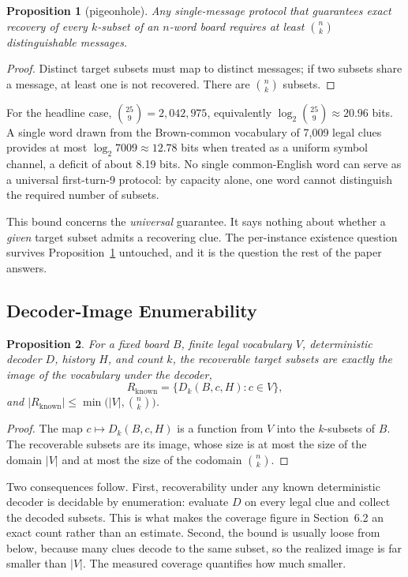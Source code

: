 \documentclass[11pt]{article}
\newtheorem{proposition}{Proposition}
\begin{document}
\begin{proposition}[pigeonhole]\label{prop:pigeonhole}
Any single-message protocol that guarantees exact recovery of every $k$-subset of
an $n$-word board requires at least $\binom{n}{k}$ distinguishable messages.
\end{proposition}

\begin{proof}
Distinct target subsets must map to distinct messages; if two subsets share a
message, at least one is not recovered. There are $\binom{n}{k}$ subsets.
\end{proof}

For the headline case, $\binom{25}{9} = 2{,}042{,}975$, equivalently
$\log_2 \binom{25}{9} \approx 20.96$ bits. A single word drawn from the
Brown-common vocabulary of 7,009 legal clues provides at most
$\log_2 7009 \approx 12.78$ bits when treated as a uniform symbol channel, a
deficit of about 8.19 bits. No single common-English word can serve as a
universal first-turn-9 protocol: by capacity alone, one word cannot distinguish
the required number of subsets.

This bound concerns the \emph{universal} guarantee. It says nothing about whether
a \emph{given} target subset admits a recovering clue. The per-instance existence
question survives Proposition~\ref{prop:pigeonhole} untouched, and it is the
question the rest of the paper answers.

\subsection{Decoder-Image Enumerability}

\begin{proposition}\label{prop:image}
For a fixed board $B$, finite legal vocabulary $V$, deterministic decoder $D$,
history $H$, and count $k$, the recoverable target subsets are exactly the image
of the vocabulary under the decoder,
\[
  R_{\mathrm{known}} = \{ D_k(B, c, H) : c \in V \},
\]
and $|R_{\mathrm{known}}| \le \min\!\big( |V|, \binom{n}{k} \big)$.
\end{proposition}

\begin{proof}
The map $c \mapsto D_k(B, c, H)$ is a function from $V$ into the $k$-subsets of
$B$. The recoverable subsets are its image, whose size is at most the size of the
domain $|V|$ and at most the size of the codomain $\binom{n}{k}$.
\end{proof}

Two consequences follow. First, recoverability under any known deterministic
decoder is decidable by enumeration: evaluate $D$ on every legal clue and collect
the decoded subsets. This is what makes the coverage figure in Section~6.2 an
exact count rather than an estimate. Second, the bound is usually loose from
below, because many clues decode to the same subset, so the realized image is far
smaller than $|V|$. The measured coverage quantifies how much smaller.
\end{document}

